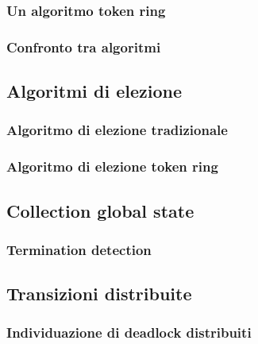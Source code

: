 \subsubsection{Un algoritmo token ring}
\subsubsection{Confronto tra algoritmi}
\subsection{Algoritmi di elezione}
\subsubsection{Algoritmo di elezione tradizionale}
\subsubsection{Algoritmo di elezione token ring}
\subsection{Collection global state}
\subsubsection{Termination detection}
\subsection{Transizioni distribuite}
\subsubsection{Individuazione di deadlock distribuiti}